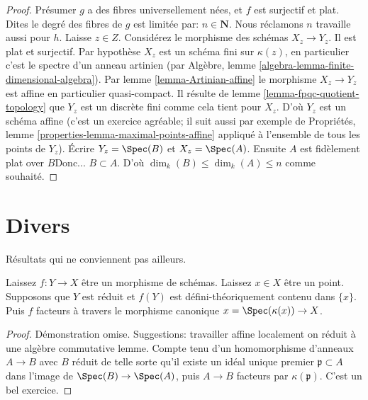 \begin{proof}

Présumer $g$ a des fibres universellement nées, et $f$ est surjectif et plat. Dites le degré des fibres de $g$ est limitée par: $n \in \mathbf{N}$. Nous réclamons $n$ travaille aussi pour $h$. Laisse $z \in Z$. Considérez le morphisme des schémas $X_z \to Y_z$. Il est plat et surjectif. Par hypothèse $X_z$ est un schéma fini sur $\kappa(z)$, en particulier c'est le spectre d'un anneau artinien (par Algèbre, lemme \ref{algebra-lemma-finite-dimensional-algebra}). Par lemme \ref{lemma-Artinian-affine} le morphisme $X_z \to Y_z$ est affine en particulier quasi-compact. Il résulte de lemme \ref{lemma-fpqc-quotient-topology}
que $Y_z$ est un discrète fini comme cela tient pour $X_z$. D'où $Y_z$ est un schéma affine (c'est un exercice agréable; il suit aussi par exemple de Propriétés, lemme \ref{properties-lemma-maximal-points-affine}
appliqué à l'ensemble de tous les points de $Y_z$). Écrire $Y_z = \Spec(B)$ et $X_z = \Spec(A)$. Ensuite $A$ est fidèlement plat over $B$Donc... $B \subset A$. D'où $\dim_k(B) \leq \dim_k(A) \leq n$ comme souhaité.

\end{proof}





\section{Divers}
\label{section-misc}

\noindent
Résultats qui ne conviennent pas ailleurs.

\begin{lemma}

\label{lemma-factor-through-point}
Laissez $f : Y \to X$ être un morphisme de schémas. Laissez $x \in X$ être un point. Supposons que $Y$ est réduit et $f(Y)$ est défini-théoriquement contenu dans $\{x\}$. Puis $f$ facteurs à travers le morphisme canonique $x = \Spec(\kappa(x)) \to X$.
\end{lemma}

\begin{proof}
Démonstration omise. Suggestions: travailler affine localement on réduit à une algèbre commutative lemme. Compte tenu d'un homomorphisme d'anneaux $A \to B$ avec $B$ réduit de telle sorte qu'il existe un idéal unique premier $\mathfrak p \subset A$ dans l'image de $\Spec(B) \to \Spec(A)$, puis $A \to B$ facteurs par $\kappa(\mathfrak p)$. C'est un bel exercice.
\end{proof}

